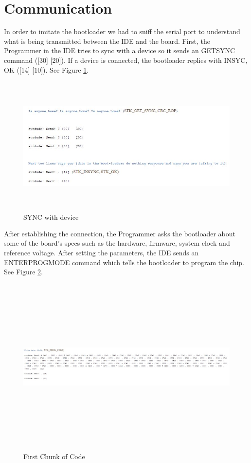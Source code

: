 \section{Communication}
In order to imitate the bootloader we had to sniff the serial port to understand what is being transmitted between the IDE and the board. First, the Programmer in the IDE tries to sync with a device so it sends an GETSYNC command ([30] [20]). If a device is connected, the bootloader replies with INSYC, OK ([14] [10]). See Figure \ref{STK_INSYNC}.
\begin{figure}[h!]
\centering
\includegraphics[height=7cm, width=16cm]{FirstStepSync.JPG}
\caption{SYNC with device}
\label{STK_INSYNC}
\end{figure}
After establishing the connection, the Programmer asks the bootloader about some of the board's specs such as the hardware, firmware, system clock and reference voltage. After setting the parameters, the IDE sends an ENTERPROGMODE command which tells the bootloader to program the chip. See Figure  \ref{ENTER_PROGMODE}.
\begin{figure}[h!]
\centering
\includegraphics[height=9cm, width=17cm]{FirstChunckOfData.JPG}
\caption{First Chunk of Code}
\label{ENTER_PROGMODE}
\end{figure}
